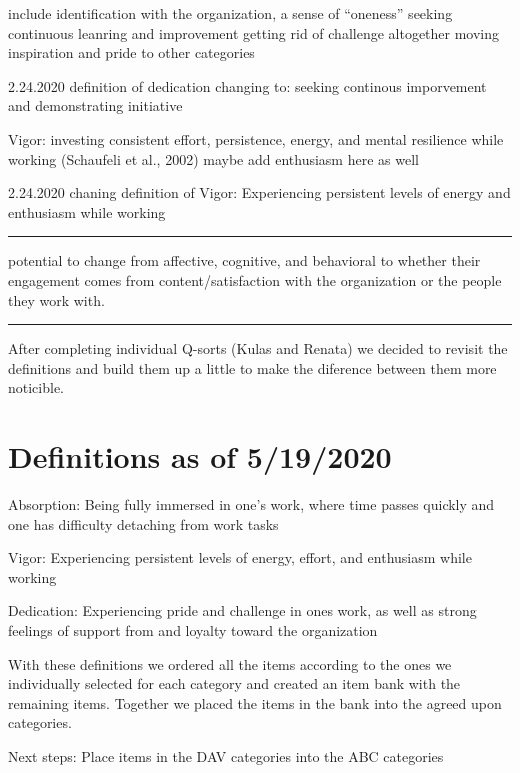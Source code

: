 \documentclass[
]{book}
\begin{document}
include identification with the organization, a sense of ``oneness''
seeking continuous leanring and improvement
getting rid of challenge altogether
moving inspiration and pride to other categories

2.24.2020
definition of dedication changing to:
seeking continous imporvement and demonstrating initiative

Vigor:
investing consistent effort, persistence, energy, and mental resilience while working (Schaufeli et al., 2002)
maybe add enthusiasm here as well

2.24.2020
chaning definition of Vigor:
Experiencing persistent levels of energy and enthusiasm while working

\begin{center}\rule{0.5\linewidth}{0.5pt}\end{center}

potential to change from affective, cognitive, and behavioral to whether their engagement comes from content/satisfaction with the organization or the people they work with.

\begin{center}\rule{0.5\linewidth}{0.5pt}\end{center}

After completing individual Q-sorts (Kulas and Renata) we decided to revisit the definitions and build them up a little to make the diference between them more noticible.

\hypertarget{definitions-as-of-5192020}{%
\section{Definitions as of 5/19/2020}\label{definitions-as-of-5192020}}

Absorption: Being fully immersed in one's work, where time passes quickly and one has difficulty detaching from work tasks

Vigor: Experiencing persistent levels of energy, effort, and enthusiasm while working

Dedication: Experiencing pride and challenge in ones work, as well as strong feelings of support from and loyalty toward the organization

With these definitions we ordered all the items according to the ones we individually selected for each category and created an item bank with the remaining items. Together we placed the items in the bank into the agreed upon categories.

Next steps:
Place items in the DAV categories into the ABC categories
\end{document}
